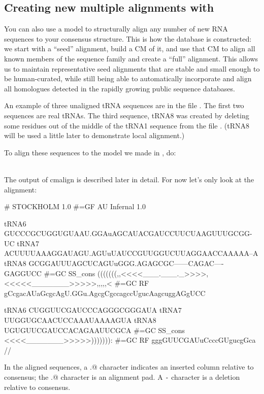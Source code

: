 \subsection{Creating new multiple alignments with }

You can also use a model to structurally align any number of new RNA
sequences to your consensus structure. This is how the 
database is constructed: we start with a ``seed'' alignment, build a CM
of it, and use that CM to align all known members of the sequence
family and create a ``full'' alignment. This allows us to maintain
representative seed alignments that are stable and small enough to be
human-curated, while still being able to automatically incorporate and
align all homologues detected in the rapidly growing public sequence
databases.

An example of three unaligned tRNA sequences are in the file
. The first two sequences are real tRNAs. The third
sequence, tRNA8 was created by deleting some residues out of the middle
of the tRNA1 sequence from the file . (tRNA8 will be used a little later to
demonstrate local alignment.)

To align these sequences to the model we made in , do:

\\

The output of cmalign is described later in detail. For now let's only
look at the alignment:

{\samepage
\begin{sreoutput}
# STOCKHOLM 1.0
#=GF AU Infernal 1.0

tRNA6        GUCCCGCUGGUGUAAU.GGAuAGCAUACGAUCCUUCUAAGUUUGCGG-UC
tRNA7        ACUUUUAAAGGAUAGU.AGUuUAUCCGUUGGUCUUAGGAACCAAAAA--A
tRNA8        GCGGAUUUAGCUCAGUuGGG.AGAGCGC------CAGAC----GAGGUCC
#=GC SS_cons (((((((,,<<<<___.___._>>>>,<<<<<_______>>>>>,,,,,<
#=GC RF      gCcgacAUaGcgcAgU.GGu.AgcgCgccagccUgucAagcuggAGgUCC

tRNA6        CUGGUUCGAUCCCAGGGCGGGAUA
tRNA7        UUGGUGCAACUCCAAAUAAAAGUA
tRNA8        UGUGUUCGAUCCACAGAAUUCGCA
#=GC SS_cons <<<<_______>>>>>))))))):
#=GC RF      gggGUUCGAUuCcccGUgucgGca
//
\end{sreoutput}
}

In the aligned sequences, a \verb@.@ character indicates an inserted
column relative to consensus; the \verb@.@ character is an alignment
pad. A \verb+-+ character is a deletion relative to consensus.

